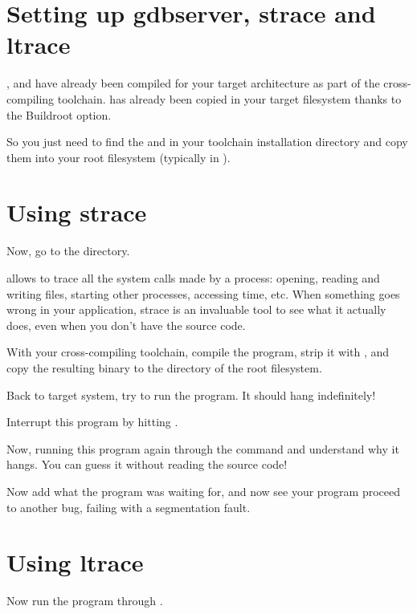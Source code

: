 \section{Setting up gdbserver, strace and ltrace}

,  and  have already been
compiled for your target architecture as part of the cross-compiling
toolchain.  has already been copied in your target
filesystem thanks to the 
Buildroot option.

So you just need to find the  and  in
your toolchain installation directory and copy them into your
root filesystem (typically in ).

\section{Using strace}

Now, go to the  directory.

 allows to trace all the system calls made by a process:
opening, reading and writing files, starting other processes,
accessing time, etc. When something goes wrong in your application,
strace is an invaluable tool to see what it actually does, even when
you don't have the source code.

With your cross-compiling toolchain, compile the
 program, strip it with ,
and copy the resulting binary to the  directory of the root
filesystem.

Back to target system, try to run the 
program. It should hang indefinitely!

Interrupt this program by hitting \code{[Ctrl] [C]}.

Now, running this program again through the  command and
understand why it hangs. You can guess it without reading the source
code!

Now add what the program was waiting for, and now see your program
proceed to another bug, failing with a segmentation fault.

\section{Using ltrace}

Now run the program through .


